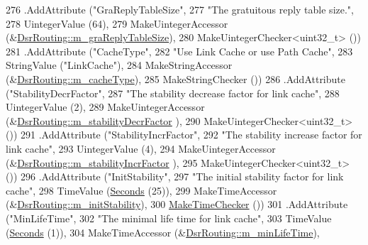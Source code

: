 \begin{DoxyCode}
276     .AddAttribute (\textcolor{stringliteral}{"GraReplyTableSize"},
277                    \textcolor{stringliteral}{"The gratuitous reply table size."},
278                    UintegerValue (64),
279                    MakeUintegerAccessor (&\hyperlink{classns3_1_1dsr_1_1DsrRouting_aa22d7408adbcefde51113d45b83d415f}{DsrRouting::m\_graReplyTableSize}),
280                    MakeUintegerChecker<uint32\_t> ())
281     .AddAttribute (\textcolor{stringliteral}{"CacheType"},
282                    \textcolor{stringliteral}{"Use Link Cache or use Path Cache"},
283                    StringValue (\textcolor{stringliteral}{"LinkCache"}),
284                    MakeStringAccessor (&\hyperlink{classns3_1_1dsr_1_1DsrRouting_a07e25fa5f4aebf7b129a31853988045b}{DsrRouting::m\_cacheType}),
285                    MakeStringChecker ())
286     .AddAttribute (\textcolor{stringliteral}{"StabilityDecrFactor"},
287                    \textcolor{stringliteral}{"The stability decrease factor for link cache"},
288                    UintegerValue (2),
289                    MakeUintegerAccessor (&\hyperlink{classns3_1_1dsr_1_1DsrRouting_a4a6db69db44738ae07289fa0993ac916}{DsrRouting::m\_stabilityDecrFactor}
      ),
290                    MakeUintegerChecker<uint32\_t> ())
291     .AddAttribute (\textcolor{stringliteral}{"StabilityIncrFactor"},
292                    \textcolor{stringliteral}{"The stability increase factor for link cache"},
293                    UintegerValue (4),
294                    MakeUintegerAccessor (&\hyperlink{classns3_1_1dsr_1_1DsrRouting_a9c6b73944ece2adc5f06b5010d9e55f2}{DsrRouting::m\_stabilityIncrFactor}
      ),
295                    MakeUintegerChecker<uint32\_t> ())
296     .AddAttribute (\textcolor{stringliteral}{"InitStability"},
297                    \textcolor{stringliteral}{"The initial stability factor for link cache"},
298                    TimeValue (\hyperlink{group__timecivil_ga33c34b816f8ff6628e33d5c8e9713b9e}{Seconds} (25)),
299                    MakeTimeAccessor (&\hyperlink{classns3_1_1dsr_1_1DsrRouting_a9b68bafde23cf10e425d341f91da3b5e}{DsrRouting::m\_initStability}),
300                    \hyperlink{group__time_ga7032965bd4afa578691d88c09e4481c1}{MakeTimeChecker} ())
301     .AddAttribute (\textcolor{stringliteral}{"MinLifeTime"},
302                    \textcolor{stringliteral}{"The minimal life time for link cache"},
303                    TimeValue (\hyperlink{group__timecivil_ga33c34b816f8ff6628e33d5c8e9713b9e}{Seconds} (1)),
304                    MakeTimeAccessor (&\hyperlink{classns3_1_1dsr_1_1DsrRouting_ad7daf5388ab1104e535b27bb4eae1421}{DsrRouting::m\_minLifeTime}),

\end{DoxyCode}
